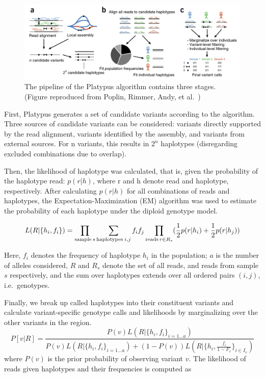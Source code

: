 \documentclass[PhD]{PHlab-thesis}
\begin{document}
\begin{figure}[h!]
	\centering
	\includegraphics[scale=0.4]{figures/Platypus.png}
	\caption{The pipeline of the Platypus algorithm contains three stages. (Figure reproduced from Poplin, Rimmer, Andy, et al.~\cite{Poplin2018GH})}
	\label{fig:Platypus} %
\end{figure}

First, Platypus generates a set of candidate variants according to the algorithm. Three sources of candidate variants can be considered: variants directly supported by the read alignment, variants identified by the assembly, and variants from external sources. For n variants, this results in $2^{n}$ haplotypes (disregarding excluded combinations due to overlap).

Then, the likelihood of haplotype was calculated, that is, given the probability of the haplotype read: $p(r|h)$, where r and h denote read and haplotype, respectively. After calculating $p(r|h)$ for all combinations of reads and haplotypes, the Expectation-Maximization (EM) algorithm was used to estimate the probability of each haplotype under the diploid genotype model.

\begin{equation}
  L(R|\{ {h_i,f_i} \}) = \prod_{\text{sample} \hspace{0.5mm} s}\sum_{\text{haplotypes} \hspace{0.75mm} i,j} {f_if_j} \prod_{\text{reads} \hspace{0.5mm} r \in R_s} (\frac{1}{2}p(r|h_i) + \frac{1}{2} p(r|h_j))
\end{equation}

Here, $f_i$ denotes the frequency of \hspace{0.05mm} haplotype $h_i$ in the population; $a$ is the number of alleles considered, $R$ and $R_s$ denote the set of all reads, and reads from sample $s$ respectively, and the sum over haplotypes extends over all ordered pairs $(i,j)$, i.e.\ genotypes.

Finally, we break up called haplotypes into their constituent variants and calculate variant-specific genotype calls and likelihoods by marginalizing over the other variants in the region.
\begin{equation}
  P[v|R] = \frac{P(v)L(R| \{ {h_i,f_i} \} _{i=1...a})}        {P(v)L(R| \{ {h_i,f_i} \}_{i=1...a})+(1-P(v))L(R|\{ {h_i,\frac{f_i}{1-F_v} \} _{i\in I_v}})}
\end{equation}
where $P(v)$ is the prior probability of observing variant $v$. The likelihood of reads given haplotypes and their frequencies is computed as
\end{document}
